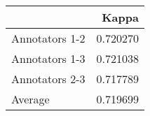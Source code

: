 \begin{tabular}{lr}
\toprule
               &    Kappa \\
\midrule
Annotators 1-2 & 0.720270 \\
Annotators 1-3 & 0.721038 \\
Annotators 2-3 & 0.717789 \\
       Average & 0.719699 \\
\bottomrule
\end{tabular}
